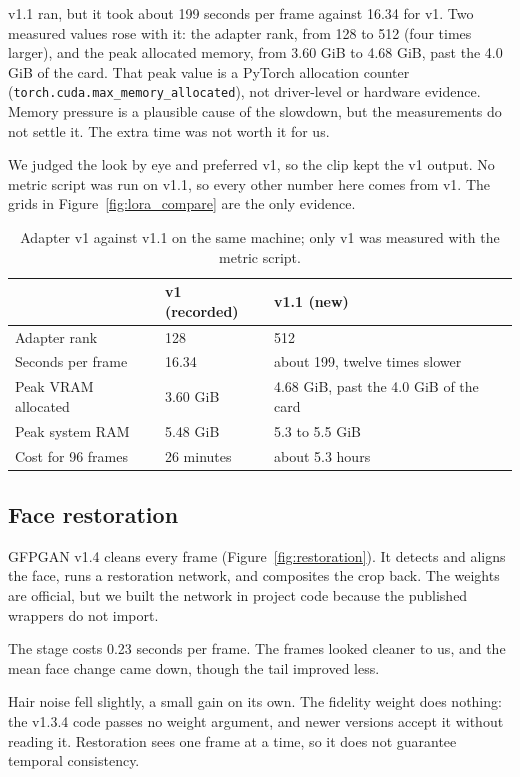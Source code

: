 v1.1 ran, but it took about 199 seconds per frame against 16.34 for v1. Two measured values rose with it: the adapter rank, from 128 to 512 (four times larger), and the peak allocated memory, from 3.60 GiB to 4.68 GiB, past the 4.0 GiB of the card. That peak value is a PyTorch allocation counter (\texttt{torch.cuda.max\_memory\_allocated}), not driver-level or hardware evidence. Memory pressure is a plausible cause of the slowdown, but the measurements do not settle it. The extra time was not worth it for us.

We judged the look by eye and preferred v1, so the clip kept the v1 output. No metric script was run on v1.1, so every other number here comes from v1. The grids in Figure~\ref{fig:lora_compare} are the only evidence.

\begin{table}[tb]
  \centering
  \footnotesize
  \begin{tabular}{@{}l l l@{}}
    \toprule
    & v1 (recorded) & v1.1 (new) \\
    \midrule
    Adapter rank & 128 & 512 \\
    Seconds per frame & 16.34 & about 199, twelve times slower \\
    Peak VRAM allocated & 3.60 GiB & 4.68 GiB, past the 4.0 GiB of the card \\
    Peak system RAM & 5.48 GiB & 5.3 to 5.5 GiB \\
    Cost for 96 frames & 26 minutes & about 5.3 hours \\
    \bottomrule
  \end{tabular}
  \caption{Adapter v1 against v1.1 on the same machine; only v1 was measured with the metric script.}
  \label{tab:adapters}
\end{table}


\subsection{Face restoration}
GFPGAN v1.4 cleans every frame (Figure~\ref{fig:restoration}). It detects and aligns the face, runs a restoration network, and composites the crop back. The weights are official, but we built the network in project code because the published wrappers do not import.

The stage costs 0.23 seconds per frame. The frames looked cleaner to us, and the mean face change came down, though the tail improved less.

Hair noise fell slightly, a small gain on its own. The fidelity weight does nothing: the v1.3.4 code passes no weight argument, and newer versions accept it without reading it. Restoration sees one frame at a time, so it does not guarantee temporal consistency.

